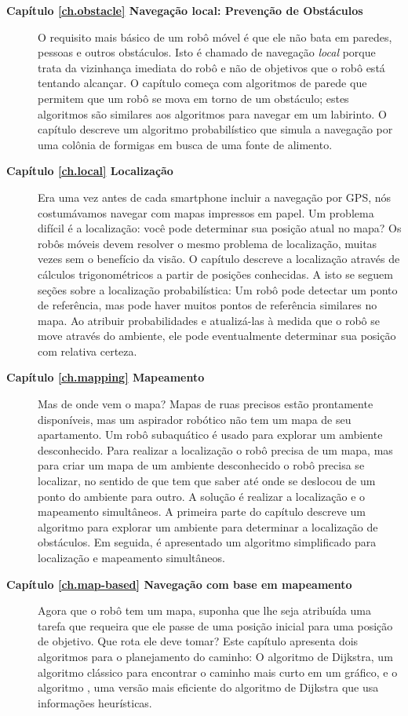 \begin{description}
\item [\textbf{Capítulo \ref{ch.obstacle} Navegação local: Prevenção de Obstáculos}] O requisito mais básico de um robô móvel é que ele não bata em paredes, pessoas e outros obstáculos. Isto é chamado de navegação \emph{local} porque trata da vizinhança imediata do robô e não de objetivos que o robô está tentando alcançar. O capítulo começa com algoritmos de parede que permitem que um robô se mova em torno de um obstáculo; estes algoritmos são similares aos algoritmos para navegar em um labirinto. O capítulo descreve um algoritmo probabilístico que simula a navegação por uma colônia de formigas em busca de uma fonte de alimento.
\item [\textbf{Capítulo \ref{ch.local} Localização}] Era uma vez antes de cada smartphone incluir a navegação por GPS, nós costumávamos navegar com mapas impressos em papel. Um problema difícil é a localização: você pode determinar sua posição atual no mapa? Os robôs móveis devem resolver o mesmo problema de localização, muitas vezes sem o benefício da visão. O capítulo descreve a localização através de cálculos trigonométricos a partir de posições conhecidas. A isto se seguem seções sobre a localização probabilística: Um robô pode detectar um ponto de referência, mas pode haver muitos pontos de referência similares no mapa. Ao atribuir probabilidades e atualizá-las à medida que o robô se move através do ambiente, ele pode eventualmente determinar sua posição com relativa certeza.

\item [\textbf{Capítulo \ref{ch.mapping} Mapeamento}] Mas de onde vem o mapa? Mapas de ruas precisos estão prontamente disponíveis, mas um aspirador robótico não tem um mapa de seu apartamento. Um robô subaquático é usado para explorar um ambiente desconhecido. Para realizar a localização o robô precisa de um mapa, mas para criar um mapa de um ambiente desconhecido o robô precisa se localizar, no sentido de que tem que saber até onde se deslocou de um ponto do ambiente para outro. A solução é realizar a localização e o mapeamento simultâneos. A primeira parte do capítulo descreve um algoritmo para explorar um ambiente para determinar a localização de obstáculos. Em seguida, é apresentado um algoritmo simplificado para localização e mapeamento simultâneos.

\item [\textbf{Capítulo \ref{ch.map-based} Navegação com base em mapeamento}] Agora que o robô tem um mapa, suponha que lhe seja atribuída uma tarefa que requeira que ele passe de uma posição inicial para uma posição de objetivo. Que rota ele deve tomar? Este capítulo apresenta dois algoritmos para o planejamento do caminho: O algoritmo de Dijkstra, um algoritmo clássico para encontrar o caminho mais curto em um gráfico, e o algoritmo \astar{}, uma versão mais eficiente do algoritmo de Dijkstra que usa informações heurísticas.
\end{description}

